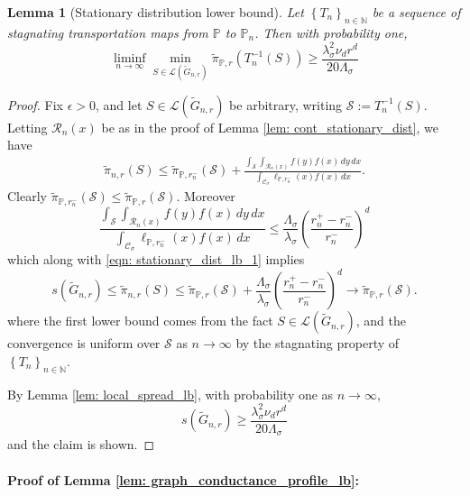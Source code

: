 \documentclass[11pt,twoside]{article}
\newtheorem{lemma}{Lemma}
\newcommand{\seq}[1]{\left\{#1\right\}_{n \in \mathbb{N}}}
\newcommand{\1}{\mathbf{1}}
\newcommand{\Pbb}{\mathbb{P}}
\newcommand{\Sset}{\mathcal{S}}
\newcommand{\Cset}{\mathcal{C}}
\newcommand{\Csig}{\Cset_{\sigma}}
\newcommand{\dx}{\,dx}
\newcommand{\dy}{\,dy}
\newcommand{\piwt}{\widetilde{\pi}}
\begin{document}
\begin{lemma}[Stationary distribution lower bound]
	\label{lem: stationary_dist_lb}
	Let $\seq{T_n}$ be a sequence of stagnating transportation maps from $\Pbb$ to $\Pbb_n$. Then with probability one,
	\begin{equation*}
	\liminf_{n \to \infty} \min_{S \in \mathcal{L}(\widetilde{G}_{n,r})} \piwt_{\Pbb,r}(T_n^{-1}(S)) \geq \frac{\lambda_{\sigma}^2 \nu_d r^d}{20\Lambda_{\sigma}}
	\end{equation*}
\end{lemma}
\begin{proof}
	Fix $\epsilon > 0$, and let $S \in \mathcal{L}(\widetilde{G}_{n,r})$ be arbitrary, writing $\Sset := T_n^{-1}(S)$. Letting $\mathcal{R}_n(x)$ be as in the proof of Lemma \ref{lem: cont_stationary_dist}, we have
	\begin{align}
	\widetilde{\pi}_{n,r}(S) \leq \piwt_{\Pbb,r_n^-}(\Sset) + \frac{\int_\Sset \int_{\mathcal{R}_n(x)}  f(y) f(x) \dy \dx}{\int_{\Csig} \ell_{\Pbb,r_n^-}(x) f(x) \dx}. \label{eqn: stationary_dist_lb_1}
	\end{align}
	Clearly $\piwt_{\Pbb,r_n^-}(\Sset) \leq \piwt_{\Pbb,r}(\Sset)$. Moreover
	\begin{equation*}
	\frac{\int_\Sset \int_{\mathcal{R}_n(x)}  f(y) f(x) \dy \dx}{\int_{\Csig} \ell_{\Pbb,r_n^-}(x) f(x) \dx} \leq \frac{\Lambda_{\sigma}}{\lambda_{\sigma}} \left(\frac{r_n^+ - r_n^-}{r_n^-}\right)^d
	\end{equation*}
	which along with \eqref{eqn: stationary_dist_lb_1} implies
	\begin{equation*}
	s(\widetilde{G}_{n,r}) \leq \widetilde{\pi}_{n,r}(S) \leq \piwt_{\Pbb,r}(\Sset) + \frac{\Lambda_{\sigma}}{\lambda_{\sigma}} \left(\frac{r_n^+ - r_n^-}{r_n^-}\right)^d \to \piwt_{\Pbb,r}(\Sset).
	\end{equation*}
	where the first lower bound comes from the fact $S \in \mathcal{L}(\widetilde{G}_{n,r})$, and the convergence is uniform over $\Sset$ as $n \to \infty$ by the stagnating property of $\seq{T_n}$. 
	
	By Lemma \ref{lem: local_spread_lb}, with probability one as $n \to \infty$,
	\begin{equation*}
	s(\widetilde{G}_{n,r}) \geq \frac{\lambda_{\sigma}^2 \nu_d r^d}{20\Lambda_{\sigma}}
	\end{equation*}
	and the claim is shown.
\end{proof}

\paragraph{Proof of Lemma \ref{lem: graph_conductance_profile_lb}:}
\end{document}
